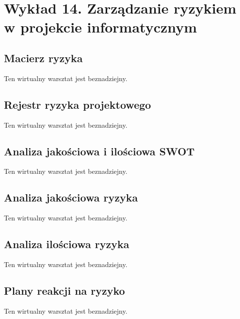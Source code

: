 \chapter{Wykład 14. Zarządzanie ryzykiem w projekcie informatycznym}

\section{Macierz ryzyka}

Ten wirtualny warsztat jest beznadziejny.


\section{Rejestr ryzyka projektowego}

Ten wirtualny warsztat jest beznadziejny.


\section{Analiza jakościowa i ilościowa SWOT}

Ten wirtualny warsztat jest beznadziejny.


\section{Analiza jakościowa ryzyka}

Ten wirtualny warsztat jest beznadziejny.


\section{Analiza ilościowa ryzyka}

Ten wirtualny warsztat jest beznadziejny.


\section{Plany reakcji na ryzyko}

Ten wirtualny warsztat jest beznadziejny.


